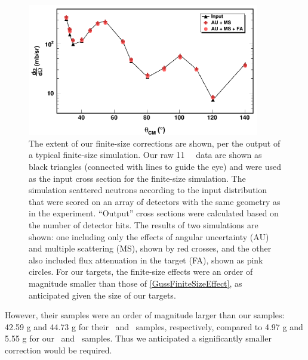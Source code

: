 \begin{figure}[tb]
    \centering
    \includegraphics[width=0.9\textwidth]{figures/finiteSizeCorrections.png}
    \caption[Effect of finite-size corrections on our neutron \el\ measurement]
    {
        The extent of our finite-size corrections are shown, per the output
        of a typical finite-size simulation. Our raw 11 \mega\electronvolt\ \snFour \el\ data
        are shown as black triangles (connected with lines to guide the eye) and
        were used as the input cross section for the finite-size simulation.
        The simulation scattered neutrons according to the input distribution
        that were scored on an array of detectors with the same geometry
        as in the experiment. ``Output'' cross sections were calculated based on
        the number of detector hits. The results of two simulations are shown:
        one including only the effects of
        angular uncertainty (AU) and multiple scattering (MS), shown by red
        crosses, and the other also included flux attenuation in the target
        (FA), shown as pink circles. For our targets, the finite-size effects
        were an order of magnitude smaller than those of
        \ref{GussFiniteSizeEffect}, as anticipated given the size of our targets.
    }
    \label{finiteSizeCorrections}
\end{figure}
However, their samples
were an order of magnitude larger than our
samples: 42.59 g and 44.73 g for their \snSixteen\ and \snTwenty\ samples,
respectively, compared to 4.97 g and 5.55 g for our \snTwelve\ and \snFour\
samples. Thus we anticipated a significantly smaller correction would be
required.
